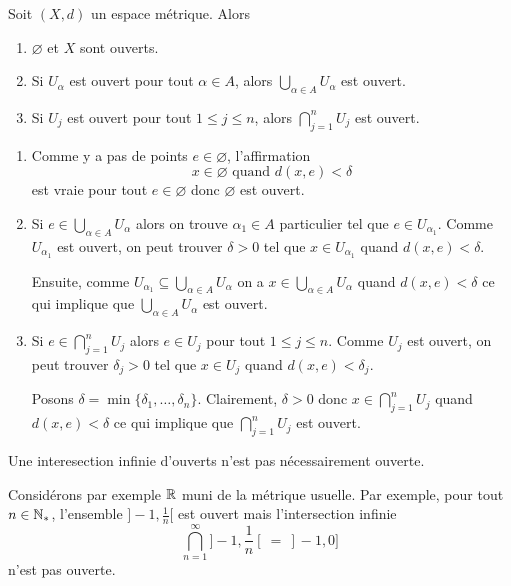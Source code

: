 \documentclass[french]{article}
\begin{document}
\begin{theoreme}
  Soit $(X, d)$ un espace métrique. Alors
  \begin{enumerate}
    \item $\varnothing$ et $X$ sont ouverts.
    \item Si $U_\alpha$ est ouvert pour tout $\alpha \in A$, alors $\bigcup\limits_{\alpha \in A} U_\alpha$ est ouvert.
    \item Si $U_j$ est ouvert pour tout $1 \leq j \leq n$, alors $\bigcap\limits_{j=1}^{n} U_j$ est ouvert.
  \end{enumerate}

  \tcblower
  \begin{preuve}
    \begin{enumerate}
      \item Comme y a pas de points $e \in \varnothing$, l'affirmation
        $$x \in \varnothing \text{ quand } d(x, e) < \delta$$
        est vraie pour tout $e \in \varnothing$ donc $\varnothing$ est ouvert.
      \item Si $e \in \bigcup\limits_{\alpha \in A} U_\alpha$ alors on trouve $\alpha_1 \in A$ particulier tel que $e \in U_{\alpha_1}$. Comme $U_{\alpha_1}$ est ouvert, on peut trouver $\delta > 0$ tel que $x \in U_{\alpha_1}$ quand $d(x, e) < \delta$. 
        \par Ensuite, comme $U_{\alpha_1} \subseteq \bigcup\limits_{\alpha \in A} U_\alpha$ on a $x \in \bigcup\limits_{\alpha \in A} U_\alpha$ quand $d(x, e) < \delta$ ce qui implique que $\bigcup\limits_{\alpha \in A} U_\alpha$ est ouvert.
      \item Si $e \in \bigcap\limits_{j=1}^{n} U_j$ alors $e \in U_j$ pour tout $1 \leq j \leq n$. Comme $U_j$ est ouvert, on peut trouver $\delta_j > 0$ tel que $x \in U_j$ quand $d(x, e) < \delta_j$.
        \par Posons $\delta = \min\{\delta_1, \dots, \delta_n\}$. Clairement, $\delta > 0$ donc $x \in \bigcap\limits_{j=1}^{n} U_j$ quand $d(x, e) < \delta$ ce qui implique que $\bigcap\limits_{j=1}^{n} U_j$ est ouvert.
    \end{enumerate}
  \end{preuve}
\end{theoreme}
\begin{remarque}
  Une interesection infinie d'ouverts n'est pas nécessairement ouverte.
\end{remarque}
Considérons par exemple $\mathbb{R}$ muni de la métrique usuelle. Par exemple, pour tout $n \in \mathbb{N}_*$, l'ensemble $]-1, \frac{1}{n}[$ est ouvert mais l'intersection infinie $$\bigcap\limits_{n=1}^{\infty} ]-1, \frac{1}{n}[ \: = \: ]-1, 0]$$ n'est pas ouverte.
\end{document}
